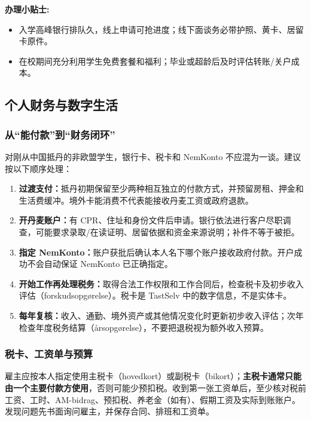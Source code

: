 \begin{grayleftbox}
\textbf{办理小贴士: }
\begin{itemize}
  \item 入学高峰银行排队久，线上申请可抢进度；线下面谈务必带护照、黄卡、居留卡原件。
  \item 在校期间充分利用学生免费套餐和福利；毕业或超龄后及时评估转账/关户成本。
\end{itemize}
\end{grayleftbox}

\subsection{个人财务与数字生活}\label{sec:finance-digital}

\subsubsection{从“能付款”到“财务闭环”}

对刚从中国抵丹的非欧盟学生，银行卡、税卡和 NemKonto 不应混为一谈。建议按以下顺序处理：

\begin{enumerate}[leftmargin=2.2em,itemsep=3pt]
  \item \textbf{过渡支付：}抵丹初期保留至少两种相互独立的付款方式，并预留房租、押金和生活费缓冲。境外卡能消费不代表能接收丹麦工资或政府退款。
  \item \textbf{开丹麦账户：}有 CPR、住址和身份文件后申请。银行依法进行客户尽职调查，可能要求录取/在读证明、居留依据和资金来源说明；补件不等于被拒。
  \item \textbf{指定 NemKonto：}账户获批后确认本人名下哪个账户接收政府付款。开户成功不会自动保证 NemKonto 已正确指定。
  \item \textbf{开始工作再处理税务：}取得合法工作权限和工作合同后，检查税卡及初步收入评估（forskudsopgørelse）。税卡是 TastSelv 中的数字信息，不是实体卡。
  \item \textbf{每年复核：}收入、通勤、境外资产或其他情况变化时更新初步收入评估；次年检查年度税务结算（årsopgørelse），不要把退税视为额外收入预算。
\end{enumerate}

\subsubsection{税卡、工资单与预算}

雇主应按本人指定使用主税卡（hovedkort）或副税卡（bikort）；\textbf{主税卡通常只能由一个主要付款方使用}，否则可能少预扣税。收到第一张工资单后，至少核对税前工资、工时、AM-bidrag、预扣税、养老金（如有）、假期工资及实际到账账户。发现问题先书面询问雇主，并保存合同、排班和工资单。


